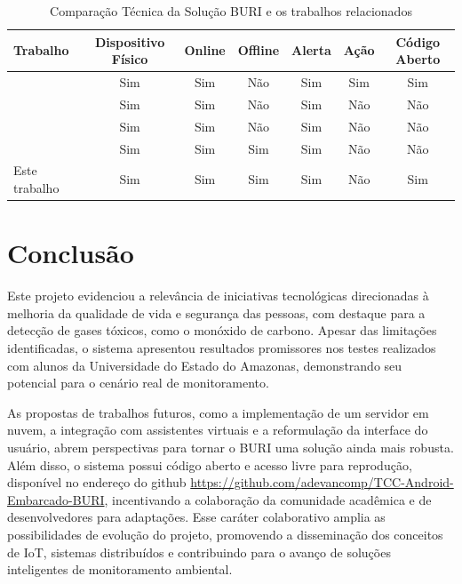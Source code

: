 \documentclass[alpha-refs,brazilian]{RBCA_v3.0}
\begin{document}
\begin{table}[ht]
    \centering
    \caption{Comparação Técnica da Solução BURI e os trabalhos relacionados}
    \label{tab:buri-trabalhos}
    \begin{tabular}{p{4cm}|c|c|c|c|c|c}
        \toprule
        \textbf{Trabalho} & \textbf{Dispositivo Físico} & \textbf{Online} & \textbf{Offline} & \textbf{Alerta}  & \textbf{Ação} & \textbf{Código Aberto} \\
        \midrule
        \citep{ref1:uea-deteccao-incendio} & Sim & Sim & Não & Sim & Sim & Sim \\ 
        \citep{ref2:air-monitoring-on-aws} & Sim & Sim & Não & Sim & Não  & Não \\ 
        \citep{ref4:novel-embedded-system} & Sim & Sim & Não & Sim & Não & Não \\ 
        \citep{ref3:alexandre-automacao-gpl} & Sim & Sim & Sim & Sim & Não & Não \\ 
        Este trabalho & Sim & Sim & Sim & Sim & Não & Sim \\
        \bottomrule
    \end{tabular}
\end{table}


\section{Conclusão}\label{sec07:conclusao}

Este projeto evidenciou a relevância de iniciativas tecnológicas direcionadas à melhoria da qualidade de vida e segurança das pessoas, com destaque para 
a detecção de gases tóxicos, como o monóxido de carbono. Apesar das limitações identificadas, o sistema apresentou resultados promissores nos testes realizados com 
alunos da Universidade do Estado do Amazonas, demonstrando seu potencial para o cenário real de monitoramento.

As propostas de trabalhos futuros, como a implementação de um servidor em nuvem, a integração com assistentes 
virtuais e a reformulação da interface do usuário, abrem perspectivas para tornar o BURI uma solução ainda mais robusta. Além disso, o sistema possui código aberto e acesso livre 
para reprodução, disponível no endereço do github \url{https://github.com/adevancomp/TCC-Android-Embarcado-BURI}, incentivando a colaboração da comunidade acadêmica e de desenvolvedores para adaptações. Esse caráter colaborativo amplia as possibilidades de evolução do projeto, 
promovendo a disseminação dos conceitos de IoT, sistemas distribuídos e contribuindo para o avanço de soluções inteligentes de monitoramento ambiental.

 
\end{document}
